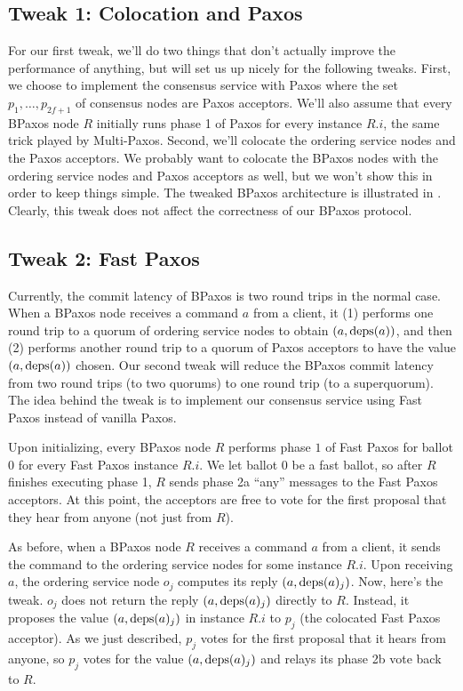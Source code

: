 \documentclass{mwhittaker}
\begin{document}
\subsection{Tweak 1: Colocation and Paxos}
For our first tweak, we'll do two things that don't actually improve the
performance of anything, but will set us up nicely for the following tweaks.
First, we choose to implement the consensus service with Paxos where the set
$p_1, \ldots, p_{2f+1}$ of consensus nodes are Paxos acceptors. We'll also
assume that every BPaxos node $R$ initially runs phase 1 of Paxos for every
instance $R.i$, the same trick played by Multi-Paxos. Second, we'll colocate
the ordering service nodes and the Paxos acceptors. We probably want to
colocate the BPaxos nodes with the ordering service nodes and Paxos acceptors
as well, but we won't show this in order to keep things simple.
%
The tweaked BPaxos architecture is illustrated in .
Clearly, this tweak does not affect the correctness of our BPaxos protocol.

{}

\subsection{Tweak 2: Fast Paxos}
Currently, the commit latency of BPaxos is two round trips in the normal case.
When a BPaxos node receives a command $a$ from a client, it (1) performs one
round trip to a quorum of ordering service nodes to obtain $(a, \text{deps}(a))$, and
then (2) performs another round trip to a quorum of Paxos acceptors to have the
value $(a, \text{deps}(a))$ chosen. Our second tweak will reduce the BPaxos commit
latency from two round trips (to two quorums) to one round trip (to a
superquorum). The idea behind the tweak is to implement our consensus service
using Fast Paxos instead of vanilla Paxos.

Upon initializing, every BPaxos node $R$ performs phase $1$ of Fast Paxos for
ballot $0$ for every Fast Paxos instance $R.i$. We let ballot $0$ be a fast
ballot, so after $R$ finishes executing phase 1, $R$ sends phase 2a ``any''
messages to the Fast Paxos acceptors. At this point, the acceptors are free to
vote for the first proposal that they hear from anyone (not just from $R$).

As before, when a BPaxos node $R$ receives a command $a$ from a client, it
sends the command to the ordering service nodes for some instance $R.i$.
Upon receiving $a$, the ordering service node $o_j$ computes its reply $(a,
\text{deps}(a)_j)$. Now, here's the tweak. $o_j$ does not return the reply $(a,
\text{deps}(a)_j)$ directly to $R$. Instead, it proposes the value $(a, \text{deps}(a)_j)$
in instance $R.i$ to $p_j$ (the colocated Fast Paxos acceptor). As we just
described, $p_j$ votes for the first proposal that it hears from anyone, so
$p_j$ votes for the value $(a, \text{deps}(a)_j)$ and relays its phase 2b vote back
to $R$.
\end{document}
